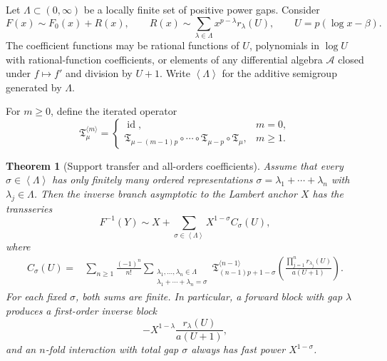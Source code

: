 \documentclass[11pt,oneside]{article}
\theoremstyle{plain}
\newtheorem{theorem}{Theorem}[section]
\theoremstyle{definition}
\theoremstyle{remark}
\newcommand{\calA}{\mathcal{A}}
\newcommand{\angles}[1]{\left\langle #1\right\rangle}
\begin{document}
Let \(\Lambda\subset(0,\infty)\) be a locally finite set of positive power
gaps.  Consider
\begin{equation}
 F(x)\sim F_0(x)+R(x),
 \qquad
 R(x)\sim\sum_{\lambda\in\Lambda}
 x^{p-\lambda}r_\lambda(U),
 \qquad U=p(\log x-\beta).
 \label{eq:general-R-grid}
\end{equation}
The coefficient functions may be rational functions of \(U\), polynomials in
\(\log U\) with rational-function coefficients, or elements of any
differential algebra \(\calA\) closed under \(f\mapsto f'\) and division by
\(U+1\).  Write \(\angles{\Lambda}\) for the additive semigroup generated by
\(\Lambda\).

For \(m\ge0\), define the iterated operator
\begin{equation}
 \mathfrak{T}^{\langle m\rangle}_{\mu}
 =\begin{cases}
 \operatorname{id},&m=0,\\[0.3em]
 \mathfrak{T}_{\mu-(m-1)p}\circ\cdots\circ
 \mathfrak{T}_{\mu-p}\circ\mathfrak{T}_{\mu},&m\ge1.
 \end{cases}
 \label{eq:T-iterated}
\end{equation}

\begin{theorem}[Support transfer and all-orders coefficients]
\label{thm:support-transfer}
Assume that every \(\sigma\in\angles{\Lambda}\) has only finitely many ordered
representations
\(\sigma=\lambda_1+\cdots+\lambda_n\) with
\(\lambda_j\in\Lambda\).  Then the inverse branch asymptotic to the Lambert
anchor \(X\) has the transseries
\begin{equation}
 \boxed{
 F^{-1}(Y)\sim X+
 \sum_{\sigma\in\angles{\Lambda}}X^{1-\sigma}C_\sigma(U),}
 \label{eq:general-inverse-grid}
\end{equation}
where
\begin{align}
 C_\sigma(U)
 ={}&\sum_{n\ge1}\frac{(-1)^n}{n!}
 \sum_{\substack{\lambda_1,\ldots,\lambda_n\in\Lambda\\
                   \lambda_1+\cdots+\lambda_n=\sigma}}
 \mathfrak{T}^{\langle n-1\rangle}_{(n-1)p+1-\sigma}
 \left(
   \frac{\prod_{j=1}^n r_{\lambda_j}(U)}{a(U+1)}
 \right).
 \label{eq:Csigma-formula}
\end{align}
For each fixed \(\sigma\), both sums are finite.  In particular, a forward
block with gap \(\lambda\) produces a first-order inverse block
\begin{equation}
 -X^{1-\lambda}\frac{r_\lambda(U)}{a(U+1)},
 \label{eq:first-gap-transfer}
\end{equation}
and an \(n\)-fold interaction with total gap \(\sigma\) always has fast power
\(X^{1-\sigma}\).
\end{theorem}
\end{document}
